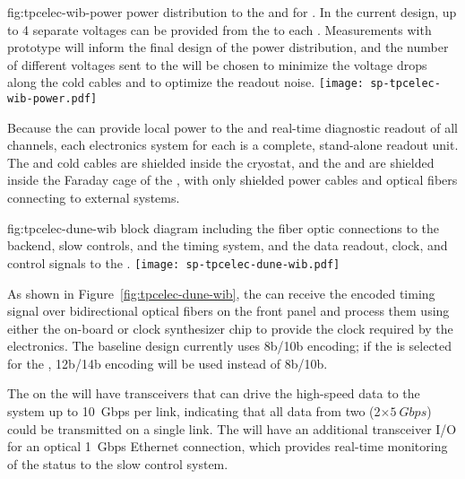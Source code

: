 \begin{dunefigure}
{fig:tpcelec-wib-power}
{ power distribution to the  and  
for . In the current design, up to \num{4} separate 
voltages can be provided from the  to each .
Measurements with prototype  will inform the final
design of the power distribution, and the number of different
voltages sent to the  will be chosen to minimize the
voltage drops along the cold cables and to optimize the readout
noise.}
\texttt{[image: sp-tpcelec-wib-power.pdf]}
\end{dunefigure}

Because the  can provide local power to the  
and real-time diagnostic readout of all channels, each  electronics 
system for each  is a complete, stand-alone readout unit. 
The  and cold cables are shielded inside the cryostat, 
and the  and  are shielded inside the Faraday 
cage of the , with only shielded power 
cables and optical fibers connecting to external systems.

\begin{dunefigure}
{fig:tpcelec-dune-wib}
{ block diagram including the fiber optic connections to
the  backend, slow controls, and the timing system, and the
data readout, clock, and control signals to the .}
\texttt{[image: sp-tpcelec-dune-wib.pdf]}
\end{dunefigure}

As shown in Figure~\ref{fig:tpcelec-dune-wib}, the  can
receive the encoded timing signal over bidirectional optical
fibers on the front panel and process them using either the on-board
or clock synthesizer chip to provide the clock required
by the  electronics.
The baseline  design 
currently uses 8b/10b encoding; if the   
 is selected for the  , 
12b/14b encoding will be used instead of 8b/10b.

The  on the  will have transceivers that can 
drive the high-speed data to the  system up to
\SI{10}{Gbps} per link, indicating that all data from
two  (2$\times\SI{5}{Gbps}$) could be transmitted 
on a single link. The  will have an additional 
transceiver I/O for an optical \SI{1}{Gbps} Ethernet connection, which 
provides real-time monitoring of the  status to the slow control system.

